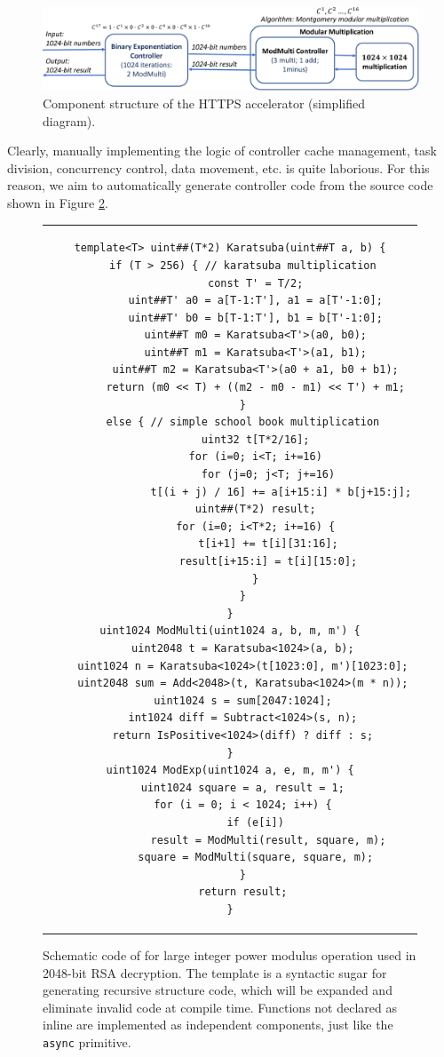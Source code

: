 \begin{figure}[htbp]
	\centering
	\includegraphics[width=1.0\textwidth]{image/https_accelerator}
	\caption{Component structure of the HTTPS accelerator (simplified diagram).}
	\label{clicknp:fig:https-accelerator}
\end{figure}

Clearly, manually implementing the logic of controller cache management, task division, concurrency control, data movement, etc. is quite laborious. For this reason, we aim to automatically generate controller code from the source code shown in Figure \ref{clicknp:fig:rsa-code}.

\begin{figure}[t!]
	\renewcommand{\baselinestretch}{0.7}
	\small
	\centering
	\begin{tabular}{c}
\begin{lstlisting}
template<T> uint##(T*2) Karatsuba(uint##T a, b) {
    if (T > 256) { // karatsuba multiplication
        const T' = T/2;
        uint##T' a0 = a[T-1:T'], a1 = a[T'-1:0];
        uint##T' b0 = b[T-1:T'], b1 = b[T'-1:0];
        uint##T m0 = Karatsuba<T'>(a0, b0);
        uint##T m1 = Karatsuba<T'>(a1, b1);
        uint##T m2 = Karatsuba<T'>(a0 + a1, b0 + b1);
        return (m0 << T) + ((m2 - m0 - m1) << T') + m1;
    }
    else { // simple school book multiplication
        uint32 t[T*2/16];
        for (i=0; i<T; i+=16)
            for (j=0; j<T; j+=16)
                t[(i + j) / 16] += a[i+15:i] * b[j+15:j];
        uint##(T*2) result;
        for (i=0; i<T*2; i+=16) {
            t[i+1] += t[i][31:16];
            result[i+15:i] = t[i][15:0];
        }
    }
}
uint1024 ModMulti(uint1024 a, b, m, m') {
    uint2048 t = Karatsuba<1024>(a, b);
    uint1024 n = Karatsuba<1024>(t[1023:0], m')[1023:0];
    uint2048 sum = Add<2048>(t, Karatsuba<1024>(m * n));
    uint1024 s = sum[2047:1024];
    int1024 diff = Subtract<1024>(s, n);
    return IsPositive<1024>(diff) ? diff : s;
}
uint1024 ModExp(uint1024 a, e, m, m') {
    uint1024 square = a, result = 1;
    for (i = 0; i < 1024; i++) {
        if (e[i])
            result = ModMulti(result, square, m);
        square = ModMulti(square, square, m);
    }
    return result;
}
\end{lstlisting}
	\end{tabular}
	\caption{Schematic code of \name for large integer power modulus operation used in 2048-bit RSA decryption. The \name template is a syntactic sugar for generating recursive structure code, which will be expanded and eliminate invalid code at compile time. Functions not declared as inline are implemented as independent components, just like the \texttt{async} primitive.}
	\label{clicknp:fig:rsa-code}
\end{figure}

